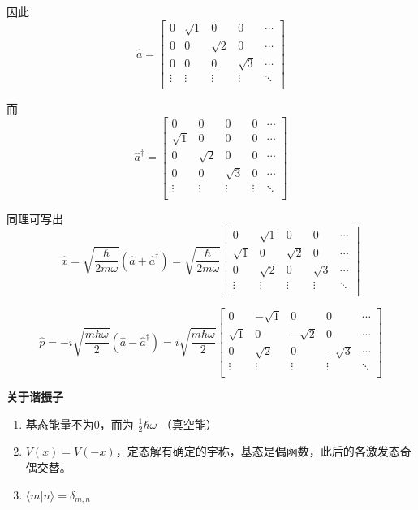\documentclass[lang=cn,10pt]{elegantbook}
\begin{document}
因此
\[
\hat{a} = \begin{bmatrix}
	0 & \sqrt{1} & 0 & 0 & \cdots \\
	0 & 0 & \sqrt{2} & 0 & \cdots \\
	0 & 0 & 0 & \sqrt{3} & \cdots \\
	\vdots & \vdots & \vdots & \vdots & \ddots \\
\end{bmatrix}
\]

而
\[
\hat{a}^\dagger = \begin{bmatrix}
	0 & 0 & 0 & 0 & \cdots \\
	\sqrt{1} & 0 & 0 & 0 & \cdots \\
	0 & \sqrt{2} & 0 & 0 & \cdots \\
	0 & 0 & \sqrt{3} & 0 & \cdots \\
	\vdots & \vdots & \vdots & \vdots & \ddots \\
\end{bmatrix}
\]

同理可写出
\[
\hat{x} = \sqrt{\frac{\hbar}{2m\omega}} (\hat{a} + \hat{a}^\dagger) = \sqrt{\frac{\hbar}{2m\omega}} \begin{bmatrix}
	0 & \sqrt{1} & 0 & 0 & \cdots \\
	\sqrt{1} & 0 & \sqrt{2} & 0 & \cdots \\
	0 & \sqrt{2} & 0 & \sqrt{3} & \cdots \\
	\vdots & \vdots & \vdots & \vdots & \ddots \\
\end{bmatrix}
\]

\[
\hat{p} = -i \sqrt{\frac{m\hbar \omega}{2}} (\hat{a} - \hat{a}^\dagger) = i \sqrt{\frac{m\hbar \omega}{2}} \begin{bmatrix}
	0 & -\sqrt{1} & 0 & 0 & \cdots \\
	\sqrt{1} & 0 & -\sqrt{2} & 0 & \cdots \\
	0 & \sqrt{2} & 0 & -\sqrt{3} & \cdots \\
	\vdots & \vdots & \vdots & \vdots & \ddots \\
\end{bmatrix}
\]

\textbf{关于谐振子}
\begin{enumerate}
	\item 基态能量不为0，而为 \(\frac{1}{2} \hbar \omega\) （真空能）
	\item \(V(x) = V(-x)\)，定态解有确定的宇称，基态是偶函数，此后的各激发态奇偶交替。
	\item \(\langle m | n \rangle = \delta_{m,n}\)
\end{enumerate}
\end{document}
